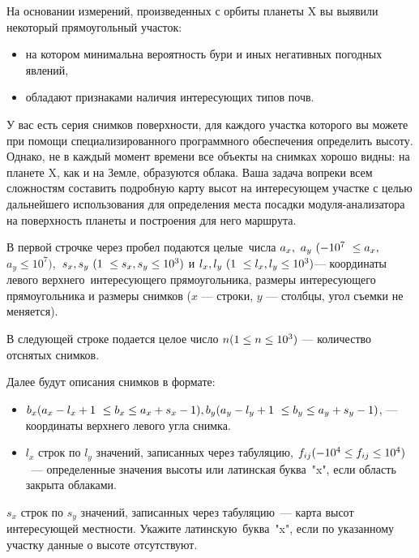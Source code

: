 
На основании измерений, произведенных с орбиты планеты X вы выявили некоторый прямоугольный участок:

\begin{itemize}
\item на котором минимальна вероятность бури и иных негативных погодных явлений,
\item обладают признаками наличия интересующих типов почв.
\end{itemize}

У вас есть серия снимков поверхности, для каждого участка которого вы можете при помощи специализированного программного обеспечения определить высоту. Однако, не в каждый момент времени все объекты на снимках хорошо видны: на планете X, как и на Земле, образуются облака. Ваша задача вопреки всем сложностям составить подробную карту высот на интересующем участке с целью дальнейшего использования для определения места посадки модуля-анализатора на поверхность планеты и построения для него маршрута. 


В первой строчке через пробел подаются целые числа $a_x, a_y \space (-10^7 \leq a_x,$ \linebreak $a_y \leq 10^7)$, $s_x, s_y \space (1 \leq s_x, s_y \leq 10^3)$ и $l_x, l_y \space (1 \leq l_x, l_y \leq 10^3)$— координаты левого верхнего интересующего прямоугольника, размеры интересующего прямоугольника и размеры снимков ($x$ — строки, $y$ — столбцы, угол съемки не меняется).

В следующей строке подается целое число $n\space(1\leq n\leq 10^3)$ — количество отснятых снимков.

Далее будут описания снимков в формате:

\begin{itemize}
\item $b_x\space (a_x-l_x+1 \leq b_x\leq a_x+s_x-1), b_y \space (a_y-l_y+1 \leq b_y\leq a_y+s_y-1)$, — координаты верхнего левого угла снимка.
\item $l_x$ строк по $l_y$ значений, записанных через табуляцию, $f_{ij}\space (-10^4\leq f_{ij}\leq 10^4)$ — определенные значения высоты или латинская буква "x", если область закрыта облаками.
\end{itemize}

\outputfmtSection

$s_x$ строк по $s_y$ значений, записанных через табуляцию — карта высот интересующей местности. Укажите латинскую буква "x", если по указанному участку данные о высоте отсутствуют.

